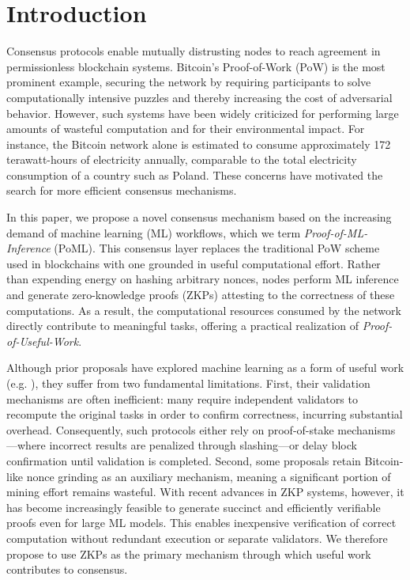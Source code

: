 \section{Introduction}
\label{sec:introduction}

Consensus protocols enable mutually distrusting nodes to reach agreement in permissionless blockchain systems. Bitcoin’s Proof-of-Work (PoW) is the most prominent example, securing the network by requiring participants to solve computationally intensive puzzles and thereby increasing the cost of adversarial behavior. However, such systems have been widely criticized for performing large amounts of wasteful computation and for their environmental impact. For instance, the Bitcoin network alone is estimated to consume approximately 172 terawatt-hours of electricity annually, comparable to the total electricity consumption of a country such as Poland. These concerns have motivated the search for more efficient consensus mechanisms.

In this paper, we propose a novel consensus mechanism based on the increasing demand of machine learning (ML) workflows, which we term \emph{Proof-of-ML-Inference} (PoML). This consensus layer replaces the traditional PoW scheme used in blockchains with one grounded in useful computational effort. Rather than expending energy on hashing arbitrary nonces, nodes perform ML inference and generate zero-knowledge proofs (ZKPs) attesting to the correctness of these computations. As a result, the computational resources consumed by the network directly contribute to meaningful tasks, offering a practical realization of \emph{Proof-of-Useful-Work}.

Although prior proposals have explored machine learning as a form of useful work (e.g. 
\cite{pot,pocl,pouw}), they suffer from two fundamental limitations. First, their validation mechanisms are often inefficient: many require independent validators to recompute the original tasks in order to confirm correctness, incurring substantial overhead. Consequently, such protocols either rely on proof-of-stake mechanisms—where incorrect results are penalized through slashing—or delay block confirmation until validation is completed. Second, some proposals retain Bitcoin-like nonce grinding as an auxiliary mechanism, meaning a significant portion of mining effort remains wasteful. With recent advances in ZKP systems, however, it has become increasingly feasible to generate succinct and efficiently verifiable proofs even for large ML models. This enables inexpensive verification of correct computation without redundant execution or separate validators. We therefore propose to use ZKPs as the primary mechanism through which useful work contributes to consensus. 

